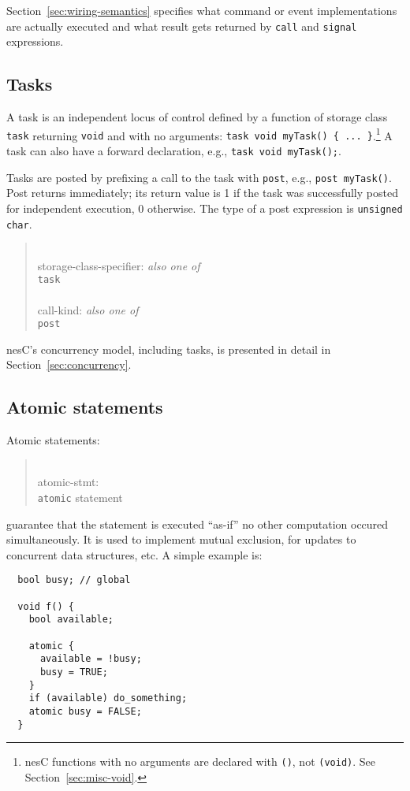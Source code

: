 \documentclass[11pt,letterpaper]{article}
\newcommand{\kw}[1]{{\tt #1}}
\newcommand{\code}[1]{{\tt #1}}
\newcommand{\nesc}{nesC\xspace}
\newcommand{\grammarshift}{\vspace*{-.7cm}}
\newcommand{\grammarindent}{\hspace*{2cm}\= \\ \kill}
\begin{document}
Section~\ref{sec:wiring-semantics} specifies what command or event
implementations are actually executed and what result gets returned by
\code{call} and \code{signal} expressions.

\subsection{Tasks}

A task is an independent locus of control defined by a function of
storage class \kw{task} returning \kw{void} and with no arguments:
\code{task void myTask() \{ ... \}}.\footnote{\nesc functions with no
arguments are declared with \code{()}, not \code{(void)}. See
Section~\ref{sec:misc-void}.} A task can also have a forward declaration, e.g.,
\code{task void myTask();}.

Tasks are posted by prefixing a call to the task with \kw{post}, e.g.,
\code{post myTask()}. Post returns immediately; its return value is 1 if
the task was successfully posted for independent execution, 0
otherwise. The type of a post expression is \code{unsigned char}.
\begin{quote} \grammarshift \em \begin{tabbing}
\grammarindent
storage-class-specifier: \emph{also one of}\\
\>	\kw{task}\\
\\
call-kind: \emph{also one of}\\
\>	\kw{post}
\end{tabbing} \end{quote}

\nesc's concurrency model, including tasks, is presented in detail in
Section~\ref{sec:concurrency}.

\subsection{Atomic statements}

Atomic statements:
\begin{quote} \grammarshift \em \begin{tabbing}
\grammarindent
atomic-stmt: \\
\>	\kw{atomic} statement\\
\end{tabbing} \end{quote}
guarantee that the statement is executed ``as-if'' no other computation
occured simultaneously. It is used to implement mutual exclusion, for
updates to concurrent data structures, etc. A simple example is:
\begin{verbatim}
  bool busy; // global

  void f() {
    bool available;

    atomic {
      available = !busy;
      busy = TRUE;
    }
    if (available) do_something;
    atomic busy = FALSE;
  }
\end{verbatim}
\end{document}
